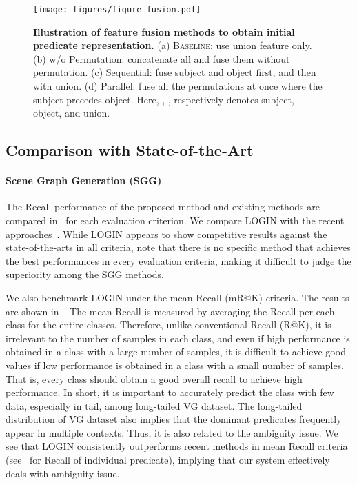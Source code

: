         \begin{figure}[t!]
            \centering
            \texttt{[image: figures/figure\_fusion.pdf]}
            \captionsetup{font=footnotesize}
            \caption{
              \textbf{Illustration of feature fusion methods to obtain initial predicate representation.} (a) \textsc{Baseline}: use union feature only. (b) w/o Permutation: concatenate all and fuse them without permutation. (c) Sequential: fuse subject and object first, and then with union. (d) Parallel: fuse all the permutations at once where the subject precedes object. Here, , ,  respectively denotes subject, object, and union.
            }
            \label{fig:fusion}
        \end{figure}
    
    \subsection{Comparison with State-of-the-Art}
    \label{section:results}
        \paragraph{Scene Graph Generation (SGG)}
            The Recall performance of the proposed method and existing methods are compared in~ for each evaluation criterion.
            We compare LOGIN with the recent approaches~\cite{xu2017scene, zellers2018neural, yang2018graph, chen2019knowledge, chen2019counterfactual, tang2019learning, zhang2019graphical}.
            While LOGIN appears to show competitive results against the state-of-the-arts in all criteria, note that there is no specific method that achieves the best performances in every evaluation criteria, making it difficult to judge the superiority among the SGG methods.
            
            We also benchmark LOGIN under the mean Recall (mR@K) criteria. The results are shown in~. The mean Recall is measured by averaging the Recall per each class for the entire classes. Therefore, unlike conventional Recall (R@K), it is irrelevant to the number of samples in each class, and even if high performance is obtained in a class with a large number of samples, it is difficult to achieve good values if low performance is obtained in a class with a small number of samples. That is, every class should obtain a good overall recall to achieve high performance. In short, it is important to accurately predict the class with few data, especially in tail, among long-tailed VG dataset. The long-tailed distribution of VG dataset also implies that the dominant predicates frequently appear in multiple contexts. Thus, it is also related to the ambiguity issue.
            We see that LOGIN consistently outperforms recent methods in mean Recall criteria (see~ for Recall of individual predicate), implying that our system effectively deals with ambiguity issue.
        
